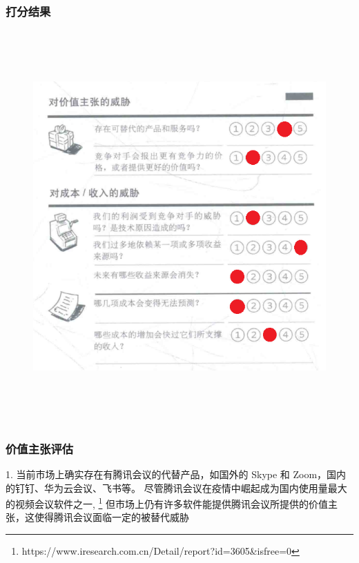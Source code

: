 \documentclass[a4paper,12pt]{article}
\begin{document}
    \subsubsection{打分结果}
    \begin{figure}[htbp]
        \centering
        \includegraphics[width=15cm,height=15cm]{png/评估威胁}
    \end{figure}
    \clearpage %

    \subsubsection{价值主张评估}

    1.
    当前市场上确实存在有腾讯会议的代替产品，如国外的 Skype 和 Zoom，国内的钉钉、华为云会议、飞书等。
    尽管腾讯会议在疫情中崛起成为国内使用量最大的视频会议软件之一,
    \footnote{https://www.iresearch.com.cn/Detail/report?id=3605\&isfree=0}
    但市场上仍有许多软件能提供腾讯会议所提供的价值主张，这使得腾讯会议面临一定的被替代威胁
\end{document}
